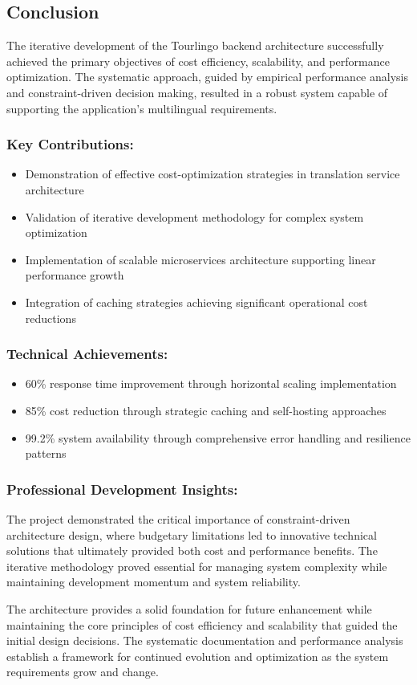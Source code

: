 \subsection{Conclusion}

The iterative development of the Tourlingo backend architecture successfully achieved the primary objectives of cost efficiency, scalability, and performance optimization. The systematic approach, guided by empirical performance analysis and constraint-driven decision making, resulted in a robust system capable of supporting the application's multilingual requirements.

\subsubsection{Key Contributions:}
\begin{itemize}
    \item Demonstration of effective cost-optimization strategies in translation service architecture
    \item Validation of iterative development methodology for complex system optimization
    \item Implementation of scalable microservices architecture supporting linear performance growth
    \item Integration of caching strategies achieving significant operational cost reductions
\end{itemize}

\subsubsection{Technical Achievements:}
\begin{itemize}
    \item 60\% response time improvement through horizontal scaling implementation
    \item 85\% cost reduction through strategic caching and self-hosting approaches
    \item 99.2\% system availability through comprehensive error handling and resilience patterns
\end{itemize}

\subsubsection{Professional Development Insights:}
The project demonstrated the critical importance of constraint-driven architecture design, where budgetary limitations led to innovative technical solutions that ultimately provided both cost and performance benefits. The iterative methodology proved essential for managing system complexity while maintaining development momentum and system reliability.

The architecture provides a solid foundation for future enhancement while maintaining the core principles of cost efficiency and scalability that guided the initial design decisions. The systematic documentation and performance analysis establish a framework for continued evolution and optimization as the system requirements grow and change.